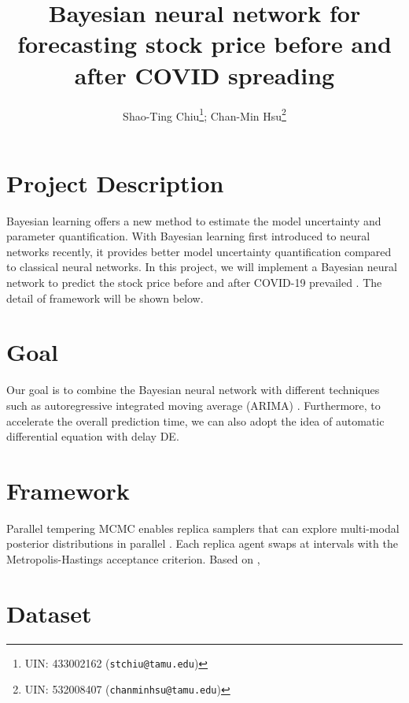 \documentclass[a4paper]{article}
\title{Bayesian neural network for forecasting stock price before and after COVID spreading}
\author{%
  Shao-Ting Chiu\thanks{UIN: 433002162 (\texttt{stchiu@tamu.edu})}; 
  Chan-Min Hsu\thanks{UIN: 532008407 (\texttt{chanminhsu@tamu.edu})}
}
\begin{document}
\maketitle


\section{Project Description}




Bayesian learning offers a new method to estimate the model uncertainty and parameter quantification. With Bayesian learning first introduced to neural networks recently, it provides better model uncertainty quantification compared to classical neural networks. In this project, we will implement a Bayesian neural network to predict the stock price before and after COVID-19 prevailed \cite{chandra2021bayesian}. The detail of framework will be shown below.


\section{Goal}

Our goal is to combine the Bayesian neural network with different techniques such as autoregressive integrated moving average (ARIMA) \cite{Rathnayaka2015AHS}. Furthermore, to accelerate the overall prediction time, we can also adopt the idea of automatic differential equation with delay DE.

\section{Framework}

Parallel tempering MCMC enables replica samplers that can explore multi-modal posterior distributions in parallel \cite{chandra2019langevin, chandra2021bayesian}. Each replica agent swaps at intervals with the Metropolis-Hastings acceptance criterion. Based on \cite{chandra2021bayesian}, 

\section{Dataset}
\end{document}
